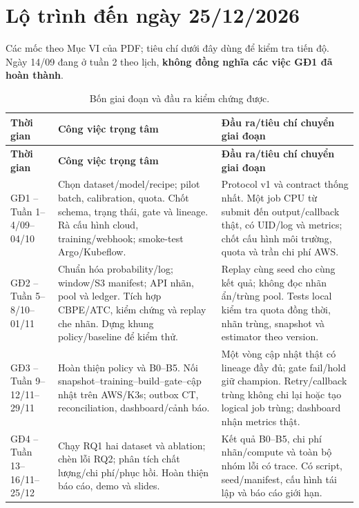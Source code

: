 \documentclass[11pt,a4paper]{article}
\begin{document}
\section{Lộ trình đến ngày 25/12/2026}
Các mốc theo Mục VI của PDF; tiêu chí dưới đây dùng để kiểm tra tiến độ. Ngày 14/09 đang ở tuần 2 theo lịch, \textbf{không đồng nghĩa các việc GĐ1 đã hoàn thành}.

\begin{longtable}{@{}L{2.3cm} L{\dimexpr(\linewidth-2.3cm-4\tabcolsep)/2\relax} L{\dimexpr(\linewidth-2.3cm-4\tabcolsep)/2\relax}@{}}
\caption{Bốn giai đoạn và đầu ra kiểm chứng được.}\\
\toprule\textbf{Thời gian} & \textbf{Công việc trọng tâm} & \textbf{Đầu ra/tiêu chí chuyển giai đoạn}\\
\midrule\endfirsthead
\toprule\textbf{Thời gian} & \textbf{Công việc trọng tâm} & \textbf{Đầu ra/tiêu chí chuyển giai đoạn}\\
\midrule\endhead
GĐ1 -- Tuần 1--4/09--04/10 & Chọn dataset/model/recipe; pilot batch, calibration, quota. Chốt schema, trạng thái, gate và lineage. Rà cấu hình cloud, training/webhook; smoke-test Argo/Kubeflow. & Protocol v1 và contract thống nhất. Một job CPU từ submit đến output/callback thật, có UID/log và metrics; chốt cấu hình môi trường, quota và trần chi phí AWS.\\
GĐ2 -- Tuần 5--8/10--01/11 & Chuẩn hóa probability/log; window/S3 manifest; API nhãn, pool và ledger. Tích hợp CBPE/ATC, kiểm chứng và replay che nhãn. Dựng khung policy/baseline để kiểm thử. & Replay cùng seed cho cùng kết quả; không đọc nhãn ẩn/trùng pool. Tests local kiểm tra quota đồng thời, nhãn trùng, snapshot và estimator theo version.\\
GĐ3 -- Tuần 9--12/11--29/11 & Hoàn thiện policy và B0--B5. Nối snapshot--training--build--gate--cập nhật trên AWS/K3s; outbox CT, reconciliation, dashboard/cảnh báo. & Một vòng cập nhật thật có lineage đầy đủ; gate fail/hold giữ champion. Retry/callback trùng không chi lại hoặc tạo logical job trùng; dashboard nhận metrics thật.\\
GĐ4 -- Tuần 13--16/11--25/12 & Chạy RQ1 hai dataset và ablation; chèn lỗi RQ2; phân tích chất lượng/chi phí/phục hồi. Hoàn thiện báo cáo, demo và slides. & Kết quả B0--B5, chi phí nhãn/compute và toàn bộ nhóm lỗi có trace. Có script, seed/manifest, cấu hình tái lập và báo cáo giới hạn.\\
\bottomrule
\end{longtable}
\end{document}
